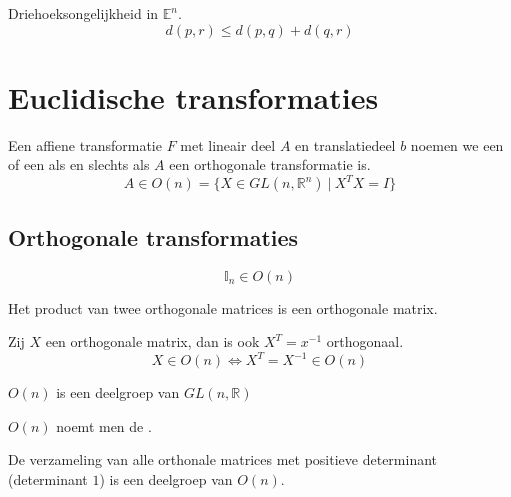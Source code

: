 \documentclass[main.tex]{subfiles}
\begin{document}
\begin{ei}
  \label{ei:driehoeksongelijkheid-in-En}
  Driehoeksongelijkheid in $\mathbb{E}^{n}$.
  \[ d(p,r) \le d(p,q) + d(q,r) \]
\end{ei}

\section{Euclidische transformaties}
\label{sec:eucl-transf}

\begin{de}
  \label{de:euclidische-transformatie}
  Een affiene transformatie $F$ met lineair deel $A$ en translatiedeel $b$ noemen we een  of een  als en slechts als $A$ een orthogonale transformatie is.
  \[ A \in O(n) = \{ X \in GL(n,\mathbb{R}^{n}) \ |\ X^{T}X = I \} \]
\end{de}

\subsection{Orthogonale transformaties}
\label{sec:orth-transf}

\begin{st}
  \[ \mathbb{I}_{n} \in O(n) \] 
\end{st}

\begin{st}
  Het product van twee orthogonale matrices is een orthogonale matrix.
\end{st}

\begin{st}
  Zij $X$ een orthogonale matrix, dan is ook $X^{T}=x^{-1}$ orthogonaal.
  \[ X \in O(n) \Leftrightarrow X^{T} = X^{-1} \in O(n)\]
\end{st}

\begin{st}
  $O(n)$ is een deelgroep van $GL(n,\mathbb{R})$
\end{st}

\begin{de}
  $O(n)$ noemt men de .
\end{de}

\begin{st}
  De verzameling van alle orthonale matrices met positieve determinant (determinant $1$) is een deelgroep van $O(n)$.
\end{st}
\end{document}
